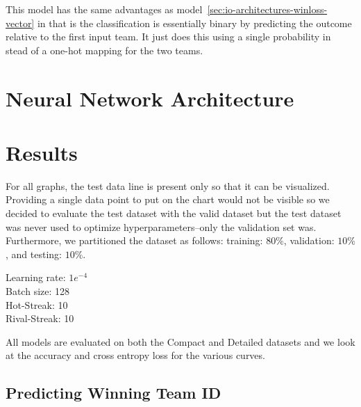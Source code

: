 \documentclass{article} %
\begin{document}
This model has the same advantages as model~\ref{sec:io-architectures-winloss-vector} in that is the classification is essentially binary by predicting the outcome relative to the first input team.  It just does this using a single probability in stead of a one-hot mapping for the two teams.  



\section{Neural Network Architecture}
\label{sec:nn-architecture}


\section{Results}
\label{sec:results}

For all graphs, the test data line is present only so that it can be visualized.  Providing a single data point to put on the chart would not be visible so we decided to evaluate the test dataset with the valid dataset but the test dataset was never used to optimize hyperparameters--only the validation set was.  Furthermore, we partitioned the dataset as follows: training: $80\%$, validation: $10\%$, and testing: $10\%$.


Learning rate: $1e^{-4}$\\
Batch size: 128\\
Hot-Streak: 10\\
Rival-Streak: 10


All models are evaluated on both the Compact and Detailed datasets and we look at the accuracy and cross entropy loss for the various curves.
\subsection{Predicting Winning Team ID}
\label{sec:results-wteamid}
\end{document}
